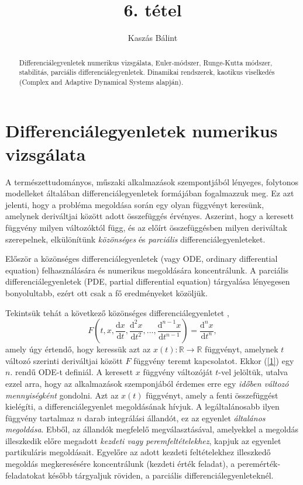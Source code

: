 \documentclass[12pt]{article}
\theoremstyle{plain}
\newcommand{\rtor}{
\mathbb{R} \to \mathbb{R}
}
\begin{document}
\title{6. tétel}
\author{Kaszás Bálint}

\maketitle


\newpage
\begin{abstract}
    Differenciálegyenletek numerikus vizsgálata, Euler-módszer, Runge-Kutta módszer, stabilitás, parciális differenciálegyenletek. Dinamikai rendszerek, kaotikus viselkedés (Complex and Adaptive Dynamical Systems alapján).
\end{abstract}

\section{Differenciálegyenletek numerikus vizsgálata}
A természettudományos, műszaki alkalmazások szempontjából lényeges, folytonos modelleket általában differenciálegyenletek formájában fogalmazzuk meg. Ez azt jelenti, hogy a probléma megoldása során egy olyan függvényt keresünk, amelynek deriváltjai között adott összefüggés érvényes. Aszerint, hogy a keresett függvény milyen változóktól függ, és az előírt összefüggésben milyen deriváltak szerepelnek, elkülönítünk {\em közönséges} és {\em parciális} differenciálegyenleteket. 

Először a közönséges differenciálegyenletek (vagy ODE, ordinary differential equation) felhasználására és numerikus megoldására koncentrálunk. A parciális differenciálegyenletek (PDE, partial differential equation) tárgyalása lényegesen bonyolultabb, ezért ott csak a fő eredményeket közöljük.

Tekintsük tehát a következő közönséges differenciálegyenletet \cite{ode},
\begin{equation}
    \label{1}
    F\left(t, x, \frac{\text{d}x}{\text{d}t}, \frac{\text{d}^2x}{\text{d}t^2}, ..., \frac{\text{d}^{n-1}x}{\text{d}t^{n-1}}\right) = \frac{\text{d}^nx}{\text{d}t^n},
\end{equation}
amely úgy értendő, hogy keressük azt az $x(t) : \rtor$ függvényt, amelynek $t$ változó szerinti deriváltjai között $F$ függvény teremt kapcsolatot. Ekkor (\ref{1}) egy $n$. rendű ODE-t definiál. A keresett $x$ függvény változóját $t$-vel jelöltük, utalva ezzel arra, hogy az alkalmazások szemponjából érdemes erre egy {\em időben változó mennyiségként} gondolni.  Azt az $x(t)$ függvényt, amely a fenti összefüggést kielégíti, a differenciálegyenlet megoldásának hívjuk. A legáltalánosabb ilyen függvény tartalmaz $n$ darab integrálási állandót, ez az egyenlet {\em általános megoldása}. Ebből, az állandók megfelelő megválasztásával, amelyekkel a megoldás illeszkedik előre megadott {\em kezdeti vagy peremfeltételekhez}, kapjuk az egyenlet partikuláris megoldásait. Egyelőre az adott kezdeti feltételekhez illeszkedő megoldás megkeresésére koncentrálunk (kezdeti érték feladat), a peremérték-feladatokat később tárgyaljuk röviden, a parciális differenciálegyenleteknél. 
\end{document}
